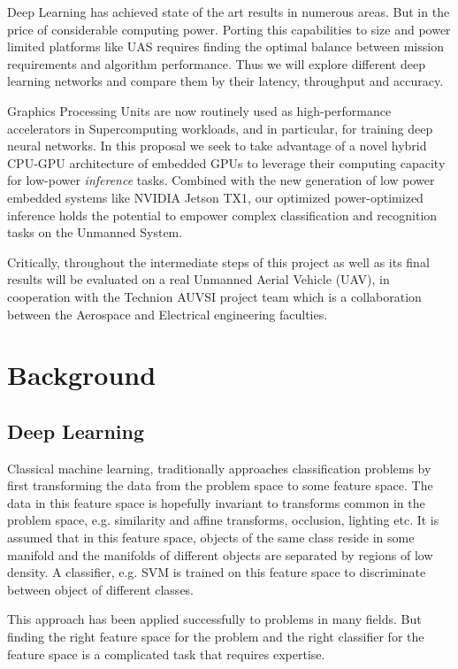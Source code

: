 \documentclass{article} %
\begin{document}
Deep Learning has achieved state of the art results in numerous areas. But in
the price of considerable computing power. Porting this capabilities to size and
power limited platforms like UAS requires finding the optimal balance between
mission requirements and algorithm performance. Thus we will explore different
deep learning networks and compare them by their latency, throughput and
accuracy.

Graphics Processing Units are now routinely used as high-performance
accelerators in Supercomputing workloads, and in particular, for training deep
neural networks.  In this proposal we seek to take advantage of a novel hybrid
CPU-GPU architecture of embedded GPUs to leverage their computing capacity for
low-power \emph{inference} tasks. Combined with the new generation of low power
embedded systems like NVIDIA Jetson TX1,  our optimized power-optimized
inference holds the potential to empower complex classification and recognition
tasks on the Unmanned System.

Critically, throughout the intermediate steps of this project as well as its
final results will be evaluated on a real Unmanned Aerial Vehicle (UAV), in
cooperation with the Technion AUVSI project team which is a collaboration
between the Aerospace and Electrical engineering faculties.

\section{Background}

\subsection{Deep Learning}
\label{sec:deep_learning}

Classical machine learning, traditionally approaches classification problems by
first transforming the data from the problem space to some feature space. The
data in this feature space is hopefully invariant to transforms common in the
problem space, e.g. similarity and affine transforms, occlusion, lighting etc.
It is assumed that in this feature space, objects of the same class reside in
some manifold and the manifolds of different objects are separated by regions of
low density. A classifier, e.g. SVM is trained on this feature space to
discriminate between object of different classes.

This approach has been applied successfully to problems in many fields. But
finding the right feature space for the problem and the right classifier for the
feature space is a complicated task that requires expertise.
\end{document}
